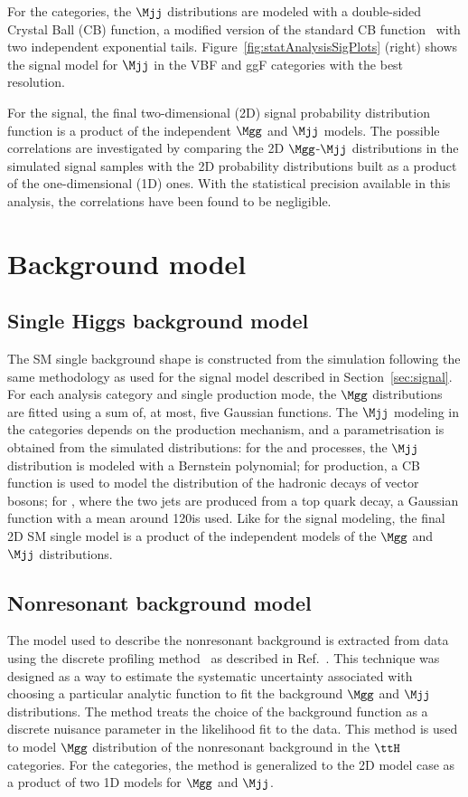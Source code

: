 \documentclass[11pt,a4paper,cmspaper,final,collab]{cms-tdr}
\begin{document}
For the \HH categories, the $\Mjj$ distributions are modeled with a double-sided Crystal Ball (CB) function, a modified version of the standard CB function~\cite{CrystalBallRef}
with two independent exponential tails. Figure~\ref{fig:statAnalysisSigPlots} (right) shows the signal model for $\Mjj$ in the VBF and ggF categories with the best resolution.

For the \HH signal, the final two-dimensional (2D) signal probability distribution function is a product of the independent $\Mgg$ and $\Mjj$ models.
The possible correlations are investigated by comparing the 2D $\Mgg$-$\Mjj$ distributions in the simulated signal samples
with the 2D probability distributions built as a product of the one-dimensional (1D) ones. With the statistical precision available in this analysis, the correlations have been found to be negligible.

\section{Background model}
\label{sec:background}
\subsection{Single Higgs background model}
\label{sec:singleHiggsbackground}
The SM single \PH background shape is constructed from
the simulation following the same methodology as used for the signal model described in Section~\ref{sec:signal}. For each analysis category and single \PH production mode,
 the $\Mgg$ distributions are fitted using a sum
of, at most, five Gaussian functions. The $\Mjj$ modeling in the \HH categories depends on the production mechanism, and a parametrisation is obtained from the 
simulated distributions: for the \ggH and \VBFH processes, the $\Mjj$ distribution is modeled with a Bernstein polynomial; for \VH production, a CB function is used to model the distribution of the hadronic decays of vector bosons; for \ttH, where the two \cPqb jets are produced 
from a top quark decay, a Gaussian function with a mean around 120\GeV is used.
 Like for the signal modeling, the final 2D SM single \PH model is a product of the independent models of the $\Mgg$ and $\Mjj$ distributions.

\subsection{Nonresonant background model}
\label{sec:nonresbackground}
The model used to describe the nonresonant background is extracted from data using the discrete profiling method~\cite{DiscreteProfilingMethod}
as described in Ref.~\cite{Khachatryan:2014ira}. This
technique was designed as a way to estimate the systematic uncertainty
associated with choosing a particular analytic function to fit the
background $\Mgg$ and $\Mjj$ distributions. The method treats the choice of the
background function as a discrete nuisance parameter in the likelihood 
fit to the data. This method is used to model $\Mgg$ distribution of the nonresonant background in the $\ttH$ categories. For the \HH categories, the method is generalized to the 2D model case as a product of two 1D models for $\Mgg$ and $\Mjj$.
\end{document}
